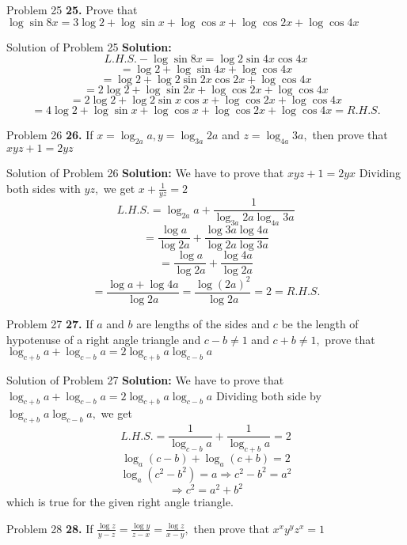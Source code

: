 \documentclass[aspectratio=1610,8pt]{beamer}
\begin{document}
\begin{frame}{Problem 25}
  \textbf{25.} Prove that $\log \sin8x = 3\log2 + \log\sin x + \log\cos x + \log\cos2x + \log\cos4x$
\end{frame}
\begin{frame}{Solution of Problem 25}
  \textbf{Solution:} $$L.H.S. - \log\sin8x = \log2\sin4x\cos4x$$
  $$= \log 2 + \log\sin4x + \log\cos4x$$
  $$=\log2 + \log2\sin2x\cos2x + \log\cos4x$$
  $$= 2\log2 + \log\sin2x + \log\cos2x + \log\cos4x$$
  $$= 2\log 2 + \log2\sin x\cos x + \log\cos2x + \log\cos4x$$
  $$= 4\log2 + \log \sin x + \log\cos x + \log\cos2x + \log\cos4x = R.H.S.$$
\end{frame}
\begin{frame}{Problem 26}
  \textbf{26.} If $x=\log_{2a}a, y =\log_{3a}2a$ and $z = \log_{4a}3a,$ then prove that $xyz + 1 = 2yz$
\end{frame}
\begin{frame}{Solution of Problem 26}
  \textbf{Solution:} We have to prove that $xyz +1 = 2yx$
  \linebreak\linebreak
  Dividing both sides with $yz,$ we get $x + \frac{1}{yz} = 2$
  $$L.H.S. = \log_{2a}a + \frac{1}{\log_{3a}2a\log_{4a}3a}$$
  $$= \frac{\log a}{\log 2a} + \frac{\log 3a\log 4a}{\log 2a\log 3a}$$
  $$= \frac{\log a}{\log 2a} + \frac{\log 4a}{\log 2a}$$
  $$= \frac{\log a + \log 4a}{\log 2a} = \frac{\log(2a)^2}{\log 2a} = 2 = R.H.S.$$
\end{frame}
\begin{frame}{Problem 27}
  \textbf{27.} If $a$ and $b$ are lengths of the sides and $c$ be the length of hypotenuse of a right angle triangle and $c - b\neq
  1$ and $c + b\neq 1,$ prove that $\log_{c + b}a + \log_{c - b}a = 2\log_{c+b}a\log_{c - b}a$
\end{frame}
\begin{frame}{Solution of Problem 27}
  \textbf{Solution:} We have to prove that $\log_{c + b}a + \log_{c - b}a = 2\log_{c+b}a\log_{c - b}a$
  \linebreak\linebreak
  Dividing both side by $\log_{c + b}a\log_{c - b}a,$ we get
  $$L.H.S. = \frac{1}{\log_{c - b}a} + \frac{1}{\log_{c + b}a} = 2$$
  $$\log_a(c - b) + \log_a(c + b) = 2$$
  $$\log_a(c^2 - b^2) = a \Rightarrow c^2 - b^2 = a^2$$
  $$\Rightarrow c^2 = a^2 + b^2$$
  which is true for the given right angle triangle.
\end{frame}
\begin{frame}{Problem 28}
  \textbf{28.} If $\frac{\log z}{y - z} = \frac{\log y}{z - x} = \frac{\log z}{x - y},$ then prove that $x^xy^yz^x = 1$
\end{frame}
\end{document}
